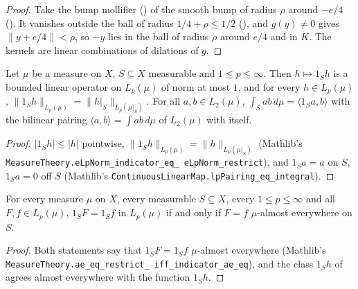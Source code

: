 \begin{proof}
\leanok
Take the bump mollifier () of the smooth bump of radius $\rho$ around
$-e/4$ (). It vanishes outside the ball of radius $1/4 + \rho \leq 1/2$
(), and $g(y) \neq 0$ gives $\|y + e/4\| < \rho$, so $-y$ lies in
the ball of radius $\rho$ around $e/4$ and in $K$. The kernels are linear combinations of
dilations of $g$.
\end{proof}

\begin{lemma}
\label{lem:indicator-lp}
\leanok
Let $\mu$ be a measure on $X$, $S \subseteq X$ measurable and $1 \leq p \leq \infty$. Then
$h \mapsto 1_S h$ is a bounded linear operator on $L_p(\mu)$ of norm at most $1$, and for every
$h \in L_p(\mu)$, $\|1_S h\|_{L_p(\mu)} = \|h|_S\|_{L_p(\mu|_S)}$. For all
$a, b \in L_2(\mu)$, $\int_S a b \, d\mu = \langle 1_S a, b \rangle$ with the bilinear pairing
$\langle a, b \rangle = \int a b \, d\mu$ of $L_2(\mu)$ with itself.
\end{lemma}

\begin{proof}
\leanok
$|1_S h| \leq |h|$ pointwise, $\|1_S h\|_{L_p(\mu)} = \|h\|_{L_p(\mu|_S)}$ (Mathlib's
\texttt{MeasureTheory.\allowbreak eLpNorm\_\allowbreak indicator\_\allowbreak eq\_\allowbreak
eLpNorm\_\allowbreak restrict}), and $1_S a = a$ on $S$, $1_S a = 0$ off $S$ (Mathlib's
\texttt{ContinuousLinearMap.\allowbreak lpPairing\_\allowbreak eq\_\allowbreak integral}).
\end{proof}

\begin{lemma}[Restrictions in $L_p$]
\label{lem:indicator-lp-eq-iff}
\leanok
{}
For every measure $\mu$ on $X$, every measurable $S \subseteq X$, every $1 \leq p \leq \infty$
and all $F, f \in L_p(\mu)$, $1_S F = 1_S f$ in $L_p(\mu)$ if and only if $F = f$
$\mu$-almost everywhere on $S$.
\end{lemma}

\begin{proof}
\leanok
Both statements say that $1_S F = 1_S f$ $\mu$-almost everywhere (Mathlib's
\texttt{MeasureTheory.\allowbreak ae\_\allowbreak eq\_\allowbreak restrict\_\allowbreak
iff\_\allowbreak indicator\_\allowbreak ae\_\allowbreak eq}), and the class $1_S h$ of
 agrees almost everywhere with the function $1_S h$.
\end{proof}

